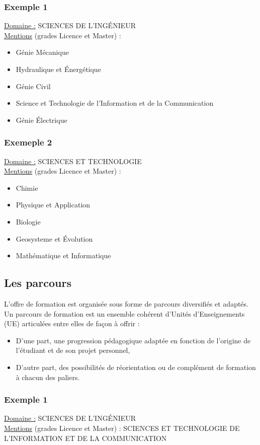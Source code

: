 \subsubsection{Exemple 1}
\underline{Domaine :} SCIENCES DE L'INGÉNIEUR \\
\underline{Mentions} (grades Licence et Master) : 
\begin{itemize}
	\item Génie Mécanique
	\item Hydraulique et Énergétique
	\item Génie Civil
	\item Science et Technologie de l'Information et de la Communication
	\item Génie Électrique
\end{itemize} 

\subsubsection{Exemeple 2}
\underline{Domaine :} SCIENCES ET TECHNOLOGIE \\
\underline{Mentions} (grades Licence et Master) :
\begin{itemize}
	\item Chimie
	\item Physique et Application
	\item Biologie
	\item Geosysteme et Évolution
	\item Mathématique et Informatique
\end{itemize}

\subsection{Les parcours}
L'offre de formation est organisée sous forme de parcours diversifiés et adaptés. Un parcours de formation est un ensemble cohérent d'Unités d'Enseignements (UE) articulées entre elles de façon à offrir : 
\begin{itemize}
	\item D'une part, une progression pédagogique adaptée en fonction de l'origine de l'étudiant et de son projet personnel, 
	\item D'autre part, des possibilités de réorientation ou de complément de formation à chacun des paliers.
\end{itemize}

\subsubsection{Exemple 1}
\underline{Domaine :} SCIENCES DE L'INGÉNIEUR \\
\underline{Mentions} (grades Licence et Master) : SCIENCES ET TECHNOLOGIE DE L'INFORMATION ET DE LA COMMUNICATION

